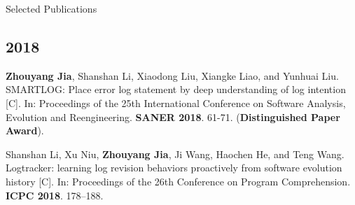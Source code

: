 \documentclass{resume}
\begin{document}
\begin{rSection}{Selected Publications}
\subsection*{2018}

\textbf{Zhouyang Jia}, Shanshan Li, Xiaodong Liu, Xiangke Liao, and Yunhuai Liu. SMARTLOG: Place error log statement by deep understanding of log intention [C]. In: Proceedings of the 25th International Conference on Software Analysis, Evolution and Reengineering. \textbf{SANER 2018}. 61-71. (\textbf{Distinguished Paper Award}).

Shanshan Li, Xu Niu, \textbf{Zhouyang Jia}, Ji Wang, Haochen He, and Teng Wang. Logtracker: learning log revision behaviors proactively from software evolution history [C]. In: Proceedings of the 26th Conference on Program Comprehension. \textbf{ICPC 2018}. 178–188.



\end{rSection}
  
\end{document}
